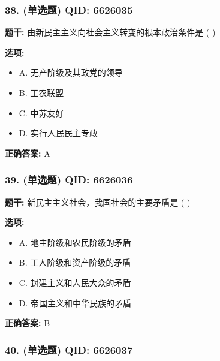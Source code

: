 \documentclass[12pt,UTF8]{ctexart}
\begin{document}
\subsubsection*{38. (单选题) \small QID: 6626035}

\textbf{题干:}
由新民主主义向社会主义转变的根本政治条件是  ( )

\textbf{选项:}
\begin{itemize}[leftmargin=*]

  \item A. 无产阶级及其政党的领导

  \item B. 工农联盟

  \item C. 中苏友好

  \item D. 实行人民民主专政

\end{itemize}

\textbf{正确答案:}
A

\vspace{0.3em}\hrulefill\vspace{0.7em}

\subsubsection*{39. (单选题) \small QID: 6626036}

\textbf{题干:}
新民主主义社会，我国社会的主要矛盾是  ( )

\textbf{选项:}
\begin{itemize}[leftmargin=*]

  \item A. 地主阶级和农民阶级的矛盾

  \item B. 工人阶级和资产阶级的矛盾

  \item C. 封建主义和人民大众的矛盾

  \item D. 帝国主义和中华民族的矛盾

\end{itemize}

\textbf{正确答案:}
B

\vspace{0.3em}\hrulefill\vspace{0.7em}

\subsubsection*{40. (单选题) \small QID: 6626037}
\end{document}

